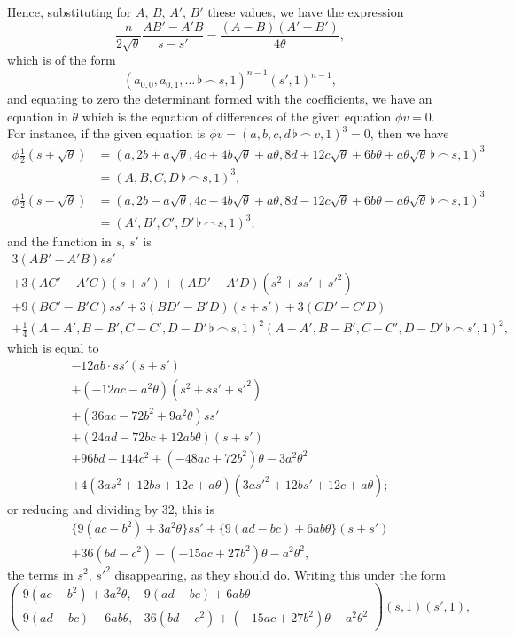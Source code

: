 \documentclass[11pt,a4paper]{book}
\begin{document}
Hence, substituting for $A$, $B$, $A'$, $B'$ these values, we have the expression
\[
\frac{n}{2\sqrt{\theta}}\frac{AB'-A'B}{s-s'}-\frac{(A-B)(A'-B')}{4\theta},
\]
which is of the form
\[
(a_{0,0},a_{0,1},\ldots\,\flat\,\frown\, s,1)^{n-1}(s',1)^{n-1},
\]
and equating to zero the determinant formed with the coefficients, we have an equation in $\theta$ which is the equation of differences of the given equation $\phi v=0$. For instance, if the given equation is $\phi v=(a,b,c,d\,\flat\,\frown\, v,1)^3=0$, then we have
\begin{align*}
\phi\tfrac{1}{2}(s+\sqrt{\theta}) &= (a,2b+a\sqrt{\theta},4c+4b\sqrt{\theta}+a\theta,8d+12c\sqrt{\theta}+6b\theta+a\theta\sqrt{\theta}\,\flat\,\frown\, s,1)^3\\
&=(A,B,C,D\,\flat\,\frown\, s,1)^3,\\
\phi\tfrac{1}{2}(s-\sqrt{\theta}) &= (a,2b-a\sqrt{\theta},4c-4b\sqrt{\theta}+a\theta,8d-12c\sqrt{\theta}+6b\theta-a\theta\sqrt{\theta}\,\flat\,\frown\, s,1)^3\\
&=(A',B',C',D'\,\flat\,\frown\, s,1)^3;
\end{align*}
and the function in $s$, $s'$ is
\begin{multline*}
3(AB'-A'B)ss'\\
+3(AC'-A'C)(s+s')+(AD'-A'D)(s^2+ss'+s'^2)\\
+9(BC'-B'C)ss'+3(BD'-B'D)(s+s')+3(CD'-C'D)\\
+\tfrac{1}{4}(A-A',B-B',C-C',D-D'\,\flat\,\frown\, s,1)^2(A-A',B-B',C-C',D-D'\,\flat\,\frown\, s',1)^2,
\end{multline*}
which is equal to
\begin{multline*}
-12ab\cdot ss'(s+s')\\
+(-12ac-a^2\theta)(s^2+ss'+s'^2)\\
+(36ac-72b^2+9a^2\theta)ss'\\
+(24ad-72bc+12ab\theta)(s+s')\\
+96bd-144c^2+(-48ac+72b^2)\theta-3a^2\theta^2\\
+4(3as^2+12bs+12c+a\theta)(3as'^2+12bs'+12c+a\theta);
\end{multline*}
or reducing and dividing by 32, this is
\begin{multline*}
\{9(ac-b^2)+3a^2\theta\}ss'+\{9(ad-bc)+6ab\theta\}(s+s')\\
+36(bd-c^2)+(-15ac+27b^2)\theta-a^2\theta^2,
\end{multline*}
the terms in $s^2$, $s'^2$ disappearing, as they should do. Writing this under the form
\[
\begin{pmatrix}
9(ac-b^2)+3a^2\theta, & 9(ad-bc)+6ab\theta \\
9(ad-bc)+6ab\theta, & 36(bd-c^2)+(-15ac+27b^2)\theta-a^2\theta^2
\end{pmatrix}(s,1)(s',1),
\]
\end{document}
